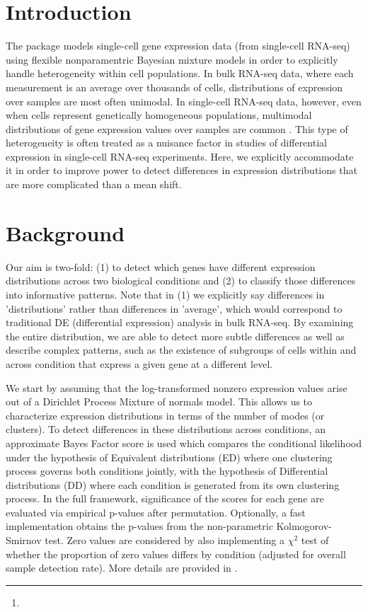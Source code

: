 \documentclass{article}\usepackage[]{graphicx}\usepackage[]{color}
\author{Keegan Korthauer\footnote{\email{keegan@jimmy.harvard.edu}}}
\begin{document}
\maketitle
\tableofcontents

\section{Introduction}

The  package models single-cell gene expression data (from single-cell RNA-seq) using flexible nonparamentric Bayesian mixture models in order to explicitly handle heterogeneity within cell populations.  In bulk RNA-seq data, where each measurement is an average over thousands of cells, distributions of expression over samples are most often unimodal.  In single-cell RNA-seq data, however, even when cells represent genetically homogeneous populations, multimodal distributions of gene expression values over samples are common \cite{korthauer2015}.  This type of heterogeneity is often treated as a nuisance factor in studies of differential expression in single-cell RNA-seq experiments.  Here, we explicitly accommodate it in order to improve power to detect differences in expression distributions that are more complicated than a mean shift.

\section{Background}

Our aim is two-fold: (1) to detect which genes have different expression distributions across two biological conditions and (2) to classify those differences into informative patterns.  Note that in (1) we explicitly say differences in 'distributions' rather than differences in 'average', which would correspond to traditional DE (differential expression) analysis in bulk RNA-seq.  By examining the entire distribution, we are able to detect more subtle differences as well as describe complex patterns, such as the existence of subgroups of cells within and across condition that express a given gene at a different level.

We start by assuming that the log-transformed nonzero expression values arise out of a Dirichlet Process Mixture of normals model.  This allows us to characterize expression distributions in terms of the number of modes (or clusters).  To detect differences in these distributions across conditions, an approximate Bayes Factor score is used which compares the conditional likelihood under the hypothesis of Equivalent distributions (ED) where one clustering process governs both conditions jointly, with the hypothesis of Differential distributions (DD) where each condition is generated from its own clustering process.  In the full framework, significance of the scores for each gene are evaluated via empirical p-values after permutation.  Optionally, a fast implementation obtains the p-values from the non-parametric Kolmogorov-Smirnov test.  Zero values are considered by also implementing a $\chi^2$ test of whether the proportion of zero values differs by condition (adjusted for overall sample detection rate).  More details are provided in \cite{korthauer2015}.
\end{document}
